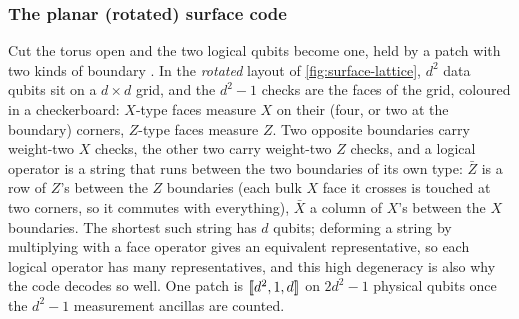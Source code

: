 \subsubsection{The planar (rotated) surface code}
Cut the torus open and the two logical qubits become one, held by a patch with two kinds of boundary \cite{bravyi-kitaev98,fowler12}. In the \emph{rotated} layout of \cref{fig:surface-lattice}, $d^2$ data qubits sit on a $d\times d$ grid, and the $d^2-1$ checks are the faces of the grid, coloured in a checkerboard: $X$-type faces measure $X$ on their (four, or two at the boundary) corners, $Z$-type faces measure $Z$. Two opposite boundaries carry weight-two $X$ checks, the other two carry weight-two $Z$ checks, and a logical operator is a string that runs between the two boundaries of its own type: $\bar Z$ is a row of $Z$'s between the $Z$ boundaries (each bulk $X$ face it crosses is touched at two corners, so it commutes with everything), $\bar X$ a column of $X$'s between the $X$ boundaries. The shortest such string has $d$ qubits; deforming a string by multiplying with a face operator gives an equivalent representative, so each logical operator has many representatives, and this high degeneracy is also why the code decodes so well. One patch is $[\![d^2,1,d]\!]$ on $2d^2-1$ physical qubits once the $d^2-1$ measurement ancillas are counted.

